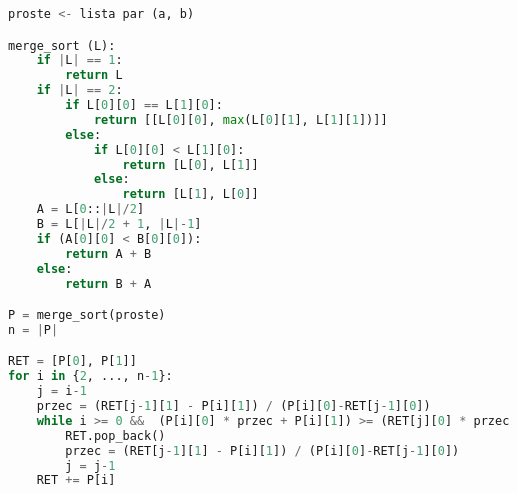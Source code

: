 \documentclass{article}
\begin{document}
\begin{lstlisting}[language=Python]
proste <- lista par (a, b)

merge_sort (L):
    if |L| == 1:
        return L
    if |L| == 2:
        if L[0][0] == L[1][0]:
            return [[L[0][0], max(L[0][1], L[1][1])]]
        else:
            if L[0][0] < L[1][0]:
                return [L[0], L[1]]
            else:
                return [L[1], L[0]]
    A = L[0::|L|/2]
    B = L[|L|/2 + 1, |L|-1]
    if (A[0][0] < B[0][0]):
        return A + B
    else:
        return B + A

P = merge_sort(proste)
n = |P|

RET = [P[0], P[1]]
for i in {2, ..., n-1}:
    j = i-1
    przec = (RET[j-1][1] - P[i][1]) / (P[i][0]-RET[j-1][0])
    while i >= 0 &&  (P[i][0] * przec + P[i][1]) >= (RET[j][0] * przec + RET[j][1]):
        RET.pop_back()
        przec = (RET[j-1][1] - P[i][1]) / (P[i][0]-RET[j-1][0])
        j = j-1
    RET += P[i]

    

\end{lstlisting}
\end{document}
